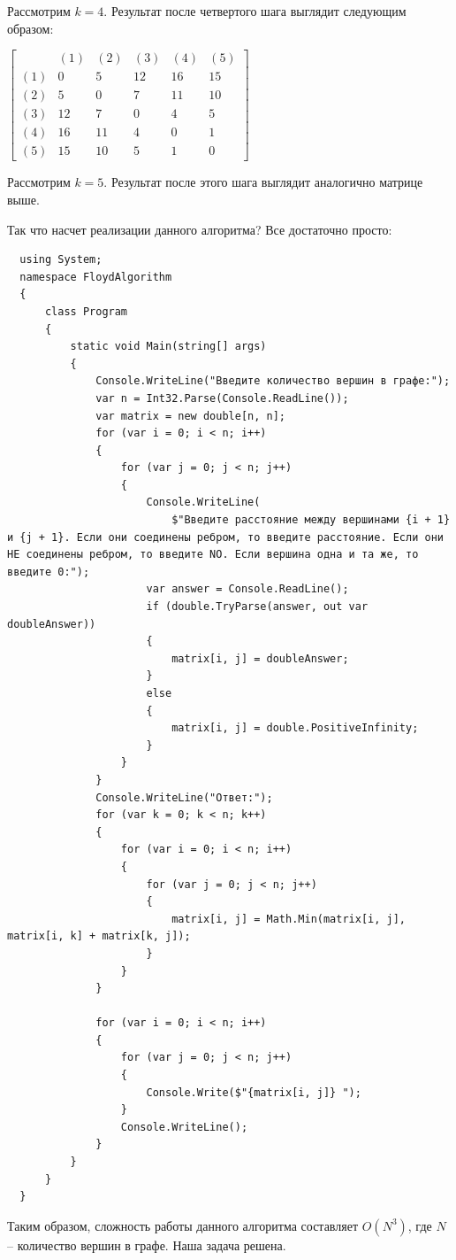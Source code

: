 \documentclass[12pt]{article}
\begin{document}
  Рассмотрим $k = 4$.
  Результат после четвертого шага выглядит следующим образом:
  \begin{center}
    $\begin{bmatrix}
       & (1)& (2)& (3)& (4)& (5)\\
      (1)& 0& 5& 12& 16& 15\\
      (2)& 5& 0& 7& 11& 10\\
      (3)& 12& 7& 0& 4& 5\\
      (4)& 16& 11& 4& 0& 1\\
      (5)& 15& 10& 5& 1& 0 
    \end{bmatrix}$
    \end{center}

    Рассмотрим $k = 5$.
    Результат после этого шага выглядит аналогично матрице выше.

\*
Так что насчет реализации данного алгоритма? Все достаточно просто:

\begin{verbatim}
  using System;
  namespace FloydAlgorithm
  {
      class Program
      {
          static void Main(string[] args)
          {
              Console.WriteLine("Введите количество вершин в графе:");
              var n = Int32.Parse(Console.ReadLine());
              var matrix = new double[n, n];
              for (var i = 0; i < n; i++)
              {
                  for (var j = 0; j < n; j++)
                  {
                      Console.WriteLine(
                          $"Введите расстояние между вершинами {i + 1} и {j + 1}. Если они соединены ребром, то введите расстояние. Если они НЕ соединены ребром, то введите NO. Если вершина одна и та же, то введите 0:");
                      var answer = Console.ReadLine();
                      if (double.TryParse(answer, out var doubleAnswer))
                      {
                          matrix[i, j] = doubleAnswer;
                      }
                      else
                      {
                          matrix[i, j] = double.PositiveInfinity;
                      }
                  }
              }
              Console.WriteLine("Ответ:");
              for (var k = 0; k < n; k++)
              {
                  for (var i = 0; i < n; i++)
                  {
                      for (var j = 0; j < n; j++)
                      {
                          matrix[i, j] = Math.Min(matrix[i, j], matrix[i, k] + matrix[k, j]);
                      }
                  }
              }
  
              for (var i = 0; i < n; i++)
              {
                  for (var j = 0; j < n; j++)
                  {
                      Console.Write($"{matrix[i, j]} ");
                  }
                  Console.WriteLine();
              }
          }
      }
  }
  \end{verbatim}

Таким образом, сложность работы данного алгоритма составляет $O(N^3)$, где $N$ -- количество вершин в графе. Наша задача решена.
\end{document}
